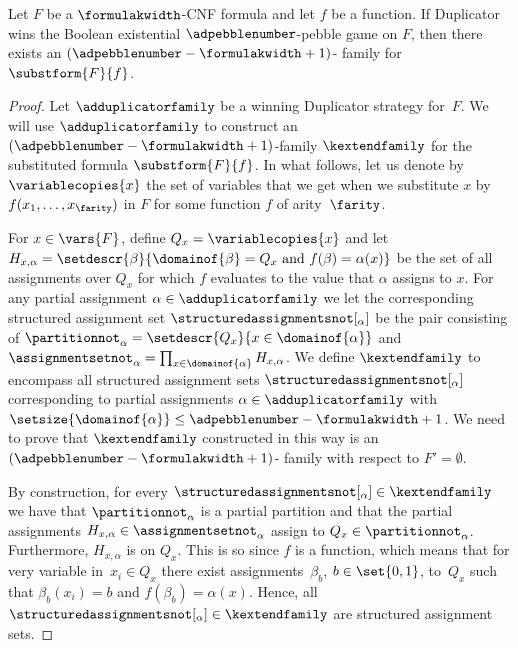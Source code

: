 \documentclass{toc}
\begin{document}
\begin{lemma}
  \label{lem:substitution}
  Let $F$ be a $\formulakwidth$-CNF formula and let $f$ be a
  \nonauthor{} function.
%
  If Duplicator wins the
  Boolean existential $\adpebblenumber$-pebble game on $F$, then there
  exists an $(\adpebblenumber - \formulakwidth + 1)$-\kextendibleNok{}
  family for 
%
  $\substform{F}{f}$.
%
%
%
\end{lemma}

\begin{proof}
  Let $\adduplicatorfamily$ be a winning Duplicator strategy for~$F$. 
  We will use 
  $\adduplicatorfamily$
  to construct an 
  $(\adpebblenumber - \formulakwidth + 1)$-\kextendibleNok family 
  $\kextendfamily$ for the substituted formula
  $\substform{F}{f}$. 
  In what follows, let us denote by
  $\variablecopies{x}$ 
  the set of
  variables that we get when we substitute $x$ by 
  $f (x_1, \ldots, x_{\farity})$ in $F$ 
  for some \nonauthor function $f$ of arity~$\farity$.

%
%
%
%
%
%
%
%
%
%
%
%
%
%
%
%
%
%
%
%
%
%
%
%
%
%
%

  For $x \in \vars{F}$,
  define
  $Q_x = \variablecopies{x}$
  and let
  $H_{x,\alpha} = 
  \setdescr{\beta}{\domainof{\beta} = Q_x \text{ and } f(\beta) = \alpha(x)}
%
%
  $
  be the set of all assignments over
  $Q_x$ for which $f$ evaluates to the value that $\alpha$ assigns to $x$.
  For any partial assignment 
  $\alpha \in \adduplicatorfamily$
  we let the corresponding structured assignment set
  $\structuredassignmentsnot[_\alpha]$ be the pair 
  consisting
  of $\partitionnot_\alpha =
  \setdescr{Q_x}{x \in \domainof{\alpha}}$ 
  and 
  $\assignmentsetnot_\alpha = \prod_{x \in \domainof{\alpha}} H_{x,\alpha}$.
  We define $\kextendfamily$ to encompass all
  structured assignment sets 
  $\structuredassignmentsnot[_\alpha]$ 
  corresponding to partial assignments 
  $\alpha \in \adduplicatorfamily$
  with 
  $\setsize{\domainof{\alpha}} \leq \adpebblenumber - \formulakwidth + 1$.
  We need to prove that
  $\kextendfamily$ 
  constructed in this way is an 
  $(\adpebblenumber - \formulakwidth + 1)$-\kextendibleNok 
  family with respect to 
  $F' = \emptyset$. 
  
%
%
%
%
%
%
%
%
%
%
%
%
  By construction, for every
  $\structuredassignmentsnot[_\alpha] \in \kextendfamily$
  we have that 
  $\partitionnot_\alpha$ 
  is a partial partition and that the partial assignments
  $H_{x,\alpha} \in \assignmentsetnot_\alpha$ 
  assign to 
  $Q_x \in \partitionnot_\alpha$.
  Furthermore, 
  $H_{x,\alpha}$ is \flippable on $Q_x$.
  This is so since 
  $f$ is a \nonauthor{} function, which means that 
%
%
  for very variable in~$x_i \in Q_x$
  there exist assignments~$\beta_b$, $b \in \set{0,1}$,
  to~$Q_x$
  such that $\beta_b(x_i) = b$
  and
  $f(\beta_b) = \alpha(x)$.
  Hence, all  
  $\structuredassignmentsnot[_\alpha] \in \kextendfamily$
  are structured assignment sets.



\end{proof}
\end{document}
